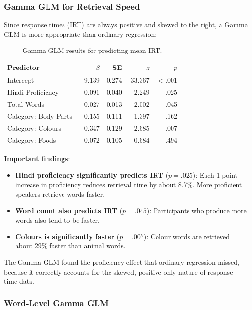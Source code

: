 \documentclass[12pt, a4paper]{article}
\begin{document}
\subsubsection{Gamma GLM for Retrieval Speed}

Since response times (IRT) are always positive and skewed to the right, a Gamma GLM is more appropriate than ordinary regression:

\begin{table}[H]
\centering
\caption{Gamma GLM results for predicting mean IRT.}
\label{tab:gamma}
\begin{tabular}{lrrrr}
\toprule
\textbf{Predictor} & \textbf{$\beta$} & \textbf{SE} & \textbf{$z$} & \textbf{$p$} \\
\midrule
Intercept & 9.139 & 0.274 & 33.367 & $<.001$ \\
Hindi Proficiency & $-0.091$ & 0.040 & $-2.249$ & .025 \\
Total Words & $-0.027$ & 0.013 & $-2.002$ & .045 \\
Category: Body Parts & 0.155 & 0.111 & 1.397 & .162 \\
Category: Colours & $-0.347$ & 0.129 & $-2.685$ & .007 \\
Category: Foods & 0.072 & 0.105 & 0.684 & .494 \\
\bottomrule
\end{tabular}
\end{table}

\textbf{Important findings}:
\begin{itemize}[nosep]
    \item \textbf{Hindi proficiency significantly predicts IRT} ($p = .025$): Each 1-point increase in proficiency reduces retrieval time by about 8.7\%. More proficient speakers retrieve words faster.
    \item \textbf{Word count also predicts IRT} ($p = .045$): Participants who produce more words also tend to be faster.
    \item \textbf{Colours is significantly faster} ($p = .007$): Colour words are retrieved about 29\% faster than animal words.
\end{itemize}

The Gamma GLM found the proficiency effect that ordinary regression missed, because it correctly accounts for the skewed, positive-only nature of response time data.

\subsubsection{Word-Level Gamma GLM}
\end{document}
